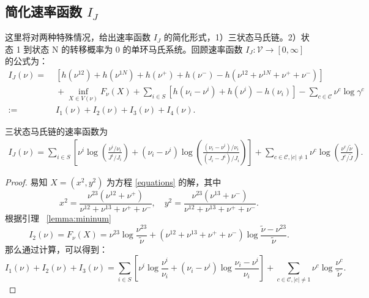 \begin{appendices}
\section{简化速率函数 $I_J$}\label{appendix:threestate}
这里将对两种特殊情况，给出速率函数 $I_J$ 的简化形式，1）三状态马氏链。2）状态 1 到状态 N 的转移概率为 0 的单环马氏系统。回顾速率函数 $I_J:\mathcal{V}\to[0,\infty]$ 的公式为：
\begin{equation*}\label{ratefunction1}
	\begin{split}
		I_J(\nu) =&\; \left[h\left(\nu^{12}\right)+h\left(\nu^{1N}\right)
		+h\left(\nu^+\right)+h\left(\nu^-\right)-h\left(\nu^{12}+\nu^{1N}+\nu^++\nu^-\right)\right] \\
		&\;+\inf_{X\in V(\nu)}F_{\nu}(X)+\sum_{i\in S}\left[ h\left(\nu_i-\nu^i\right)+h\left(\nu^i\right)
		-h\left(\nu_i\right)\right]-\sum_{c\in\mathcal{C}}\nu^c\log\gamma^c\\
		:=&\;I_1(\nu)+I_2(\nu)+I_3(\nu)+I_4(\nu).
	\end{split}
\end{equation*}
\begin{proposition}
三状态马氏链的速率函数为
\begin{align*}
I_J(\nu) =
\sum_{i\in S} \left[\nu^{i}\log \left(\frac{\nu^{i}/\nu_i}{J^i/J_i}\right) + (\nu_i - \nu^i)\log \left(\frac{(\nu_i - \nu^i)/\nu_i}{(J_i - J^i)/J_i} \right)
\right]
+ \sum_{c \in \mathcal{C}, |c|\neq 1} \nu^{c} \log \left(\frac{\nu^{c}/\tilde{\nu}}{J^c/\tilde{J}}\right).
\end{align*}
\end{proposition}
\begin{proof}
	易知 $X=(x^2,y^2)$ 为方程 \eqref{equations} 的解，其中
\begin{equation*}
	x^{2}=\frac{\nu^{23}\left(\nu^{12}+\nu^+\right)}{\nu^{12}+\nu^{13}+\nu^++\nu^-},\quad y^{2}=\frac{\nu^{23}\left(\nu^{13}+\nu^-\right)}{\nu^{12}+\nu^{13}+\nu^++\nu^-}.
\end{equation*}
根据引理 ~\ref{lemma:mininum}
\begin{equation*}\label{Fnu2}
I_2(\nu)=F_{\nu}(X)=\nu^{23}\log\frac{\nu^{23}}{\tilde{\nu}}+\left(\nu^{12}+\nu^{13}+\nu^++\nu^-\right)\log\frac{\tilde{\nu}-\nu^{23}}{\tilde{\nu}}.
\end{equation*}
那么通过计算，可以得到：
\begin{equation}\label{I1I2I3}
	I_1(\nu)+I_2(\nu)+I_3(\nu) = \sum_{i\in S} \left[\nu^{i}\log \frac{\nu^{i}}{\nu_i} + (\nu_i - \nu^i)\log \frac{\nu_i - \nu^i}{\nu_i} 
	\right]
	+ \sum_{c \in \mathcal{C}, |c|\neq 1} \nu^{c} \log \frac{\nu^{c}}{\tilde{\nu}}.

\end{equation}
\end{proof}
\end{appendices}
